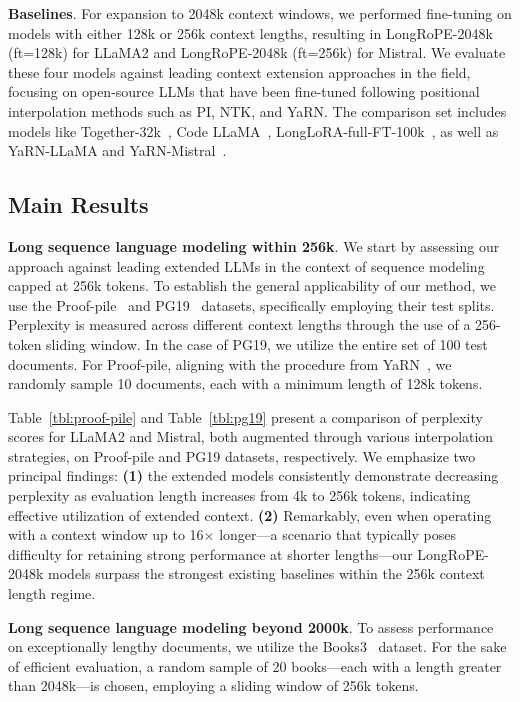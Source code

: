 \textbf{Baselines}. For expansion to 2048k context windows, we performed fine-tuning on models with either 128k or 256k context lengths, resulting in LongRoPE-2048k (ft=128k) for LLaMA2 and LongRoPE-2048k (ft=256k) for Mistral. We evaluate these four models against leading context extension approaches in the field, focusing on open-source LLMs that have been fine-tuned following positional interpolation methods such as PI, NTK, and YaRN. The comparison set includes models like Together-32k~\cite{together}, Code LLaMA~\cite{codellama}, LongLoRA-full-FT-100k~\cite{longlora}, as well as YaRN-LLaMA and YaRN-Mistral~\cite{yarn}.

\subsection{Main Results}

\label{sec:mainresult}
\textbf{Long sequence language modeling within 256k}. We start by assessing our approach against leading extended LLMs in the context of sequence modeling capped at 256k tokens. To establish the general applicability of our method, we use the Proof-pile~\cite{pg19} and PG19~\cite{pile} datasets, specifically employing their test splits. Perplexity is measured across different context lengths through the use of a 256-token sliding window. In the case of PG19, we utilize the entire set of 100 test documents. For Proof-pile, aligning with the procedure from YaRN~\cite{yarn}, we randomly sample 10 documents, each with a minimum length of 128k tokens.

Table~\ref{tbl:proof-pile} and Table~\ref{tbl:pg19} present a comparison of perplexity scores for LLaMA2 and Mistral, both augmented through various interpolation strategies, on Proof-pile and PG19 datasets, respectively. We emphasize two principal findings: \textbf{(1)} the extended models consistently demonstrate decreasing perplexity as evaluation length increases from 4k to 256k tokens, indicating effective utilization of extended context. \textbf{(2)} Remarkably, even when operating with a context window up to 16$\times$ longer—a scenario that typically poses difficulty for retaining strong performance at shorter lengths—our LongRoPE-2048k models surpass the strongest existing baselines within the 256k context length regime.

\textbf{Long sequence language modeling beyond 2000k}. To assess performance on exceptionally lengthy documents, we utilize the Books3~\cite{pile} dataset. For the sake of efficient evaluation, a random sample of 20 books—each with a length greater than 2048k—is chosen, employing a sliding window of 256k tokens.


